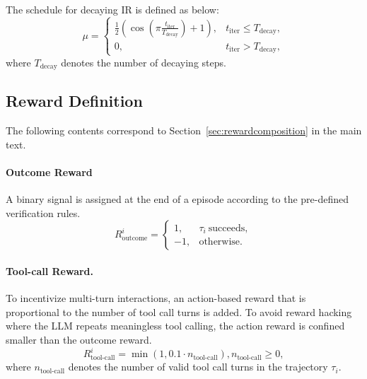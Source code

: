 \documentclass[]{youtu} %
\begin{document}
The schedule for decaying IR is defined as below:
\begin{equation}\label{eq:mudecay}
    \mu=
\begin{cases}
\frac{1}{2}(\cos(\pi\frac{t_{\text{iter}} }{ T_{\text{decay}} })+1), & t_{\text{iter}}\leq T_{\text{decay}},\\
0, & t_{\text{iter}}> T_{\text{decay}},
\end{cases}
\end{equation}
\noindent where $T_{\text{decay}}$ denotes the number of decaying steps.





\subsection{Reward Definition}
\label{sec:rewarddef}

The following contents correspond to Section~\ref{sec:rewardcomposition} in the main text.

\paragraph{Outcome Reward}
A binary signal is assigned at the end of a episode according to the pre-defined verification rules.
\begin{equation}\label{eq:outcomereward}
    R^i_{\text{outcome}}=\begin{cases}
        1, & \tau_i\ \text{succeeds},\\
        -1, & \text{otherwise}.
    \end{cases}
\end{equation}


\paragraph{Tool-call Reward.}
To incentivize multi-turn interactions,
an action-based reward that is proportional to the number of tool call turns is added.
To avoid reward hacking where the LLM repeats meaningless tool calling,
the action reward is confined smaller than the outcome reward.
\begin{equation}\label{eq:actionreward}
    R^i_{\text{tool-call}}=\min(1, 0.1\cdot n_{\text{tool-call}}), n_{\text{tool-call}}\geq0,
\end{equation}
where $n_{\text{tool-call}}$ denotes the number of valid tool call turns in the trajectory $\tau_i$.
\end{document}

